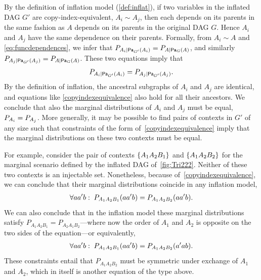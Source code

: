 {By the definition of inflation model (\cref{def:inflat}), if two variables in the inflated DAG $G'$ are copy-index-equivalent, $A_i \sim A_j$, then each depends on its parents in the same fashion as $A$ depends on its parents in the original DAG $G$. Hence $A_i$ and $A_j$ have the same dependence on their parents.  Formally, from $A_i \sim A$ and \cref{eq:funcdependences}, we infer that $\pfunc{A_i| \Pa[G']{A_i}}=\pfunc{A|\Pa[G]{A}}$, and similarly $\pfunc{A_j| \Pa[G']{A_j}}=\pfunc{A|\Pa[G]{A}}$.  These two equations imply that 
\begin{align}\label{copyindexequivalence}
\pfunc{A_i| \Pa[G']{A_i}}=\pfunc{A_j|\Pa[G']{A_j}}.
 \end{align}
By the definition of inflation, the ancestral subgraphs of $A_i$ and $A_j$ are identical, and equations like \cref{copyindexequivalence} also hold for all their ancestors. We conclude that also the marginal distributions of $A_i$ and $A_j$ must be equal, $\pfunc{A_i}=\pfunc{A_j}$.
More generally, it may be possible to find pairs of contexts in $G'$ of any size such that constraints of the form of~\cref{copyindexequivalence} imply that the marginal distributions on these two contexts must be equal. 

For example, consider the pair of contexts $\brackets{A_1 A_2 B_1}$ and $\brackets{A_1 A_2 B_2}$ for the marginal scenario defined by the inflated DAG of~\cref{fig:Tri222}. Neither of these two contexts is an injectable set.  Nonetheless, because of~\cref{copyindexequivalence}, we can conclude that their marginal distributions coincide in any inflation model,
\begin{align}\label{CIEconsequence}
\forall{a a' b}:\;\p[A_1 A_2 B_1]{a a' b} = \p[A_1 A_2 B_2]{a a' b}.
\end{align}
We can also conclude that in the inflation model these marginal distributions satisfy  $P_{A_1 A_2 B_1}=P_{A_2 A_1 B_2}$---where now the order of $A_1$ and $A_2$ is opposite on the two sides of the equation---or equivalently, 
\begin{align}\label{CIEconsequence2}
\forall{a a' b}:\;\p[A_1 A_2 B_1]{a a' b} = \p[A_1 A_2 B_2]{a' a b}.
\end{align}
These constraints entail that $P_{A_1 A_2 B_2}$ must be symmetric under exchange of $A_1$ and $A_2$, which in itself is another equation of the type above.

}
